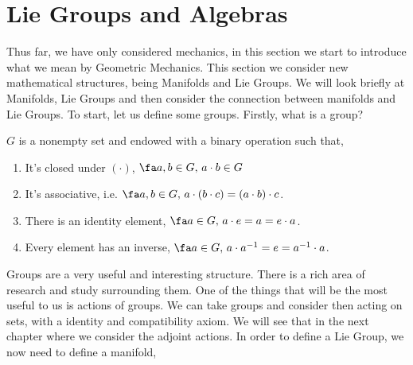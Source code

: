 
\section{Lie Groups and Algebras}

Thus far, we have only considered mechanics, in this section we start to introduce what we mean by Geometric Mechanics. This section we consider new mathematical structures, being Manifolds and Lie Groups. We will look briefly at Manifolds, Lie Groups and then consider the connection between manifolds and Lie Groups. To start, let us define some groups. Firstly, what is a group?
\begin{ndefi}[Group]
  $G$ is a nonempty set and endowed with a binary operation such that,
  \begin{enumerate}
    \item It's closed under $(\cdot)$, $\fa a, b \in G,\, a \cdot b \in G$
    \item It's associative, i.e. $\fa a, b \in G,\,a \cdot ( b \cdot c) = (a \cdot b) \cdot c$.
    \item There is an identity element, $\fa a \in G,\, a \cdot e = a = e \cdot a$.
    \item Every element has an inverse, $\fa a \in G,\,a \cdot a^{-1} = e = a^{-1} \cdot a$.
  \end{enumerate}
\end{ndefi}

Groups are a very useful and interesting structure. There is a rich area of research and study surrounding them. One of the things that will be the most useful to us is actions of groups. We can take groups and consider then acting on sets, with a identity and compatibility axiom. We will see that in the next chapter where we consider the adjoint actions. In order to define a Lie Group, we now need to define a manifold,

